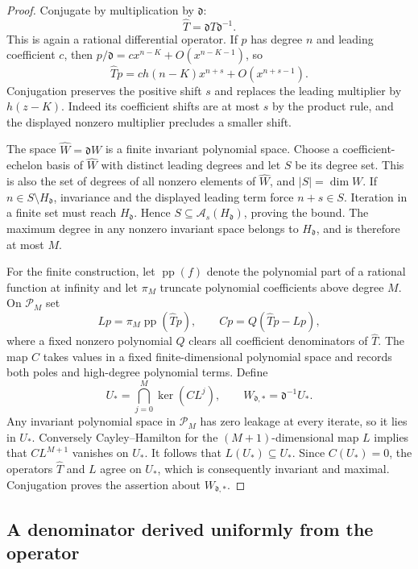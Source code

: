 \documentclass[11pt,a4paper]{article}
\theoremstyle{definition}\newtheorem{definition}[theorem]{Definition}
\theoremstyle{remark}\newtheorem{remark}[theorem]{Remark}
\newcommand{\Pcal}{\mathcal P}\newcommand{\PP}{\mathcal P}\newcommand{\Pp}{\mathcal P}
\numberwithin{equation}{section}
\begin{document}
\begin{proof}
Conjugate by multiplication by $\mathfrak d$:
\[
 \widehat T=\mathfrak d T\mathfrak d^{-1}.
\]
This is again a rational differential operator.  If $p$ has degree $n$ and
leading coefficient $c$, then $p/\mathfrak d=cx^{n-K}+O(x^{n-K-1})$, so
\[
 \widehat Tp=c h(n-K)x^{n+s}+O(x^{n+s-1}).
\]
Conjugation preserves the positive shift $s$ and replaces the leading
multiplier by $h(z-K)$.  Indeed its coefficient shifts are at most $s$ by
the product rule, and the displayed nonzero multiplier precludes a smaller
shift.

The space $\widehat W=\mathfrak d W$ is a finite invariant polynomial space.
Choose a coefficient-echelon basis of $\widehat W$ with distinct leading
degrees and let $S$ be its degree set.  This is also the set of degrees of
all nonzero elements of $\widehat W$, and $|S|=\dim W$.  If
$n\in S\setminus H_{\mathfrak d}$, invariance and the displayed leading
term force $n+s\in S$.  Iteration in a finite set must reach
$H_{\mathfrak d}$.  Hence $S\subseteq\mathcal A_s(H_{\mathfrak d})$, proving
the bound.  The maximum degree in any nonzero invariant space belongs to
$H_{\mathfrak d}$, and is therefore at most $M$.

For the finite construction, let $\operatorname{pp}(f)$ denote the
polynomial part of a rational function at infinity and let $\pi_M$ truncate
polynomial coefficients above degree $M$.  On $\Pcal_M$ set
\[
 Lp=\pi_M\operatorname{pp}(\widehat Tp),
 \qquad Cp=Q(\widehat Tp-Lp),
\]
where a fixed nonzero polynomial $Q$ clears all coefficient denominators
of $\widehat T$.  The map $C$ takes values in a fixed finite-dimensional
polynomial space and records both poles and high-degree polynomial terms.
Define
\begin{equation}
 U_* =\bigcap_{j=0}^{M}\ker(CL^j),
 \qquad W_{\mathfrak d,*}=\mathfrak d^{-1}U_*.
 \label{ext-heisei-kernel}
\end{equation}
Any invariant polynomial space in $\Pcal_M$ has zero leakage at every
iterate, so it lies in $U_*$.  Conversely Cayley--Hamilton for the
$(M+1)$-dimensional map $L$ implies that $CL^{M+1}$ vanishes on $U_*$.
It follows that $L(U_*)\subseteq U_*$.  Since $C(U_*)=0$, the operators
$\widehat T$ and $L$ agree on $U_*$, which is consequently invariant and
maximal.  Conjugation proves the assertion about $W_{\mathfrak d,*}$.
\end{proof}

\subsection{A denominator derived uniformly from the operator}
\end{document}
